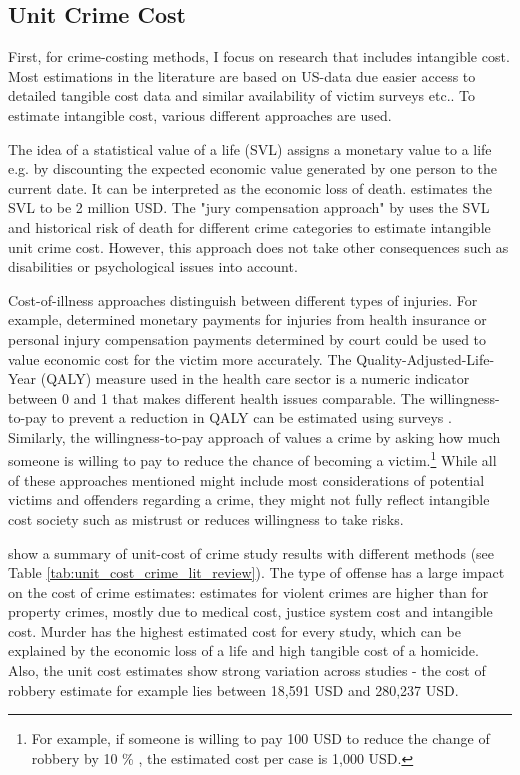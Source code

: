 \documentclass[a4paper,12pt]{article}
\begin{document}
\subsection{Unit Crime Cost}
First, for crime-costing methods, I focus on research that includes intangible cost. Most estimations in the literature are based on US-data due easier access to detailed tangible cost data and similar availability of victim surveys etc..
To estimate intangible cost, various different approaches are used. 

The idea of a statistical value of a life (SVL) assigns a monetary value to a life e.g. by discounting the expected economic value generated by one person to the current date. It can be interpreted as the economic loss of death. \cite{viscusi} estimates the SVL to be 2 million USD.
The "jury compensation approach" by \citep{cohen1988} uses the SVL and historical risk of death for different crime categories to estimate intangible unit crime cost. However, this approach does not take other consequences such as disabilities or psychological issues into account.

Cost-of-illness approaches distinguish between different types of injuries. For example, determined monetary payments for injuries from health insurance or personal injury compensation payments determined by court could be used to value economic cost for the victim more accurately. 
The Quality-Adjusted-Life-Year (QALY) measure used in the health care sector is a numeric indicator between 0 and 1 that makes different health issues comparable. The willingness-to-pay to prevent a reduction in QALY can be estimated using surveys \citep{entorf}.
Similarly, the willingness-to-pay approach of \citep{cohen2004} values a crime by asking how much someone is willing to pay to reduce the chance of becoming a victim.\footnote{For example, if someone is willing to pay 100 USD to reduce the change of robbery by 10 \% , the estimated cost per case is 1,000 USD.} 
While all of these approaches mentioned might include most considerations of potential victims and offenders regarding a crime, they might not fully reflect intangible cost society such as mistrust or reduces willingness to take risks.

\cite{collister} show a summary of unit-cost of crime study results with different methods (see Table \ref{tab:unit_cost_crime_lit_review}). 
The type of offense has a large impact on the cost of crime estimates: estimates for violent crimes are higher than for property crimes, mostly due to medical cost, justice system cost and intangible cost. Murder has the highest estimated cost for every study, which can be explained by the economic loss of a life and high tangible cost of a homicide. 
Also, the unit cost estimates show strong variation across studies - the cost of robbery estimate for example lies between 18,591 USD and 280,237 USD. 
\end{document}
